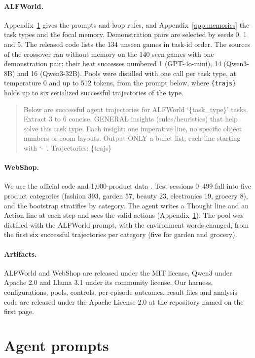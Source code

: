 \paragraph{ALFWorld.} Appendix~\ref{app:prompts} gives the prompts and loop rules, and
Appendix~\ref{app:memories} the task types and the focal memory. Demonstration pairs are selected by
seeds 0, 1 and 5. The released code lists the 134 unseen games in task-id order.
The sources of the crossover ran without memory on the 140 seen games with one demonstration pair; their
heat successes numbered 1 (GPT-4o-mini), 14 (Qwen3-8B) and 16 (Qwen3-32B). Pools were distilled with
one call per task type, at temperature 0 and up to 512 tokens, from the prompt below, where
\texttt{\{trajs\}} holds up to six serialized successful trajectories of the type.
\begin{quote}\small
Below are successful agent trajectories for ALFWorld `\{task\_type\}' tasks. Extract 3 to 6 concise,
GENERAL insights (rules/heuristics) that help solve this task type. Each insight: one imperative line,
no specific object numbers or room layouts. Output ONLY a bullet list, each line starting with `- '.
Trajectories: \{trajs\}
\end{quote}

\paragraph{WebShop.} We use the official code and 1,000-product data \citep{yao2022webshop}. Test
sessions 0--499 fall into five product categories (fashion 393, garden 57, beauty 23, electronics 19,
grocery 8), and the bootstrap stratifies by category. The agent writes a Thought line and an Action line
at each step and sees the valid actions (Appendix~\ref{app:prompts}). The pool was distilled with the ALFWorld prompt, with the
environment words changed, from the first six successful trajectories per category (five for garden and
grocery).

\paragraph{Artifacts.} ALFWorld and WebShop are released under the MIT license, Qwen3 under Apache 2.0
and Llama 3.1 under its community license. Our harness, configurations, pools, controls, per-episode
outcomes, result files and analysis code are released under the Apache License 2.0 at the repository
named on the first page.

\section{Agent prompts}
\label{app:prompts}

